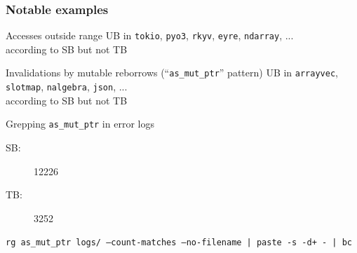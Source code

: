 \begin{frame}
    \frametitle{Notable examples}
    \begin{block}{Accesses outside range}
        UB in \texttt{tokio}, \texttt{pyo3}, \texttt{rkyv}, \texttt{eyre}, \texttt{ndarray}, ...\\
        according to SB but not TB
    \end{block}
    \begin{block}{Invalidations by mutable reborrows (``\texttt{as\_mut\_ptr}'' pattern)}
        UB in \texttt{arrayvec}, \texttt{slotmap}, \texttt{nalgebra}, \texttt{json}, ...\\
        according to SB but not TB
    \end{block}
    \begin{block}{Grepping \texttt{as\_mut\_ptr} in error logs}
        \begin{description}
            \item[SB:] 12226
            \item[TB:] 3252
        \end{description}
        {\scriptsize\texttt{rg as\_mut\_ptr logs/ ---count-matches ---no-filename | paste -s -d+ - | bc}}
    \end{block}
\end{frame}
